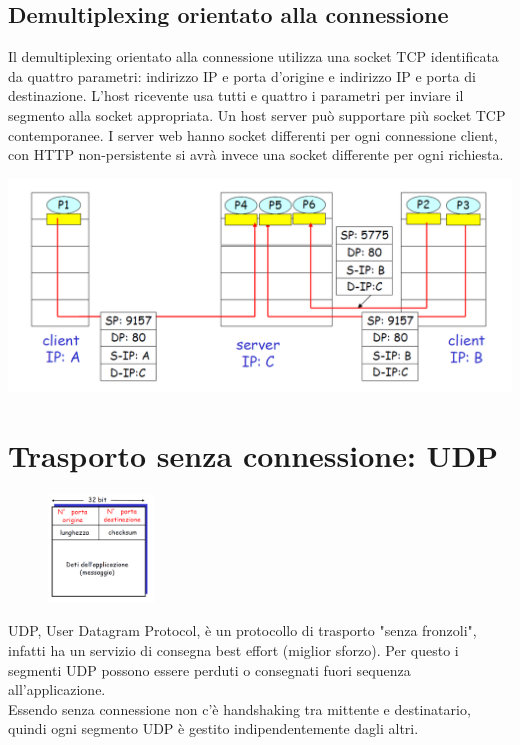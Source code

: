 \documentclass{report}
\begin{document}
	\subsection{Demultiplexing orientato alla connessione}
	Il demultiplexing orientato alla connessione utilizza una socket TCP identificata da quattro parametri: indirizzo IP e porta d'origine e indirizzo IP e porta di destinazione. L'host ricevente usa tutti e quattro i parametri per inviare il segmento alla socket appropriata. Un host server può supportare più socket TCP contemporanee. I server web hanno socket differenti per ogni connessione client, con HTTP non-persistente si avrà invece una socket differente per ogni richiesta.
	\begin{center}
		\includegraphics[width=0.7\linewidth]{socket-tcp}
	\end{center}
	\section{Trasporto senza connessione: UDP}
	\begin{figure}
		\centering
		\vspace{-30pt}
		\includegraphics[width=0.25\textwidth]{segmento-udp}
		\vspace{-20pt}
	\end{figure}

	UDP, User Datagram Protocol, è un protocollo di trasporto "senza fronzoli", infatti ha un servizio di consegna best effort (miglior sforzo). Per questo i segmenti UDP possono essere perduti o consegnati fuori sequenza all'applicazione.\medskip\\ Essendo senza connessione non c'è handshaking tra mittente e destinatario, quindi ogni segmento UDP è gestito indipendentemente dagli altri.
\end{document}
